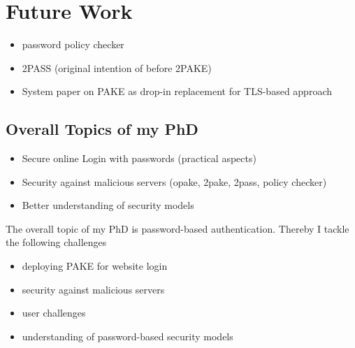 \chapter{Future Work}\label{ch:futurework}
\begin{itemize}
	\item password policy checker
	\item 2PASS (original intention of before 2PAKE)
	\item System paper on PAKE as drop-in replacement for TLS-based approach
\end{itemize}

\section{Overall Topics of my PhD}
\begin{itemize}
	\item Secure online Login with passwords (practical aspects)
	\item Security against malicious servers (opake, 2pake, 2pass, policy checker)
	\item Better understanding of security models
\end{itemize}

\noindent
The overall topic of my PhD is password-based authentication.
Thereby I tackle the following challenges
\begin{itemize}
	\item deploying PAKE for website login
	\item security against malicious servers
	\item user challenges
	\item understanding of password-based security models
\end{itemize}
